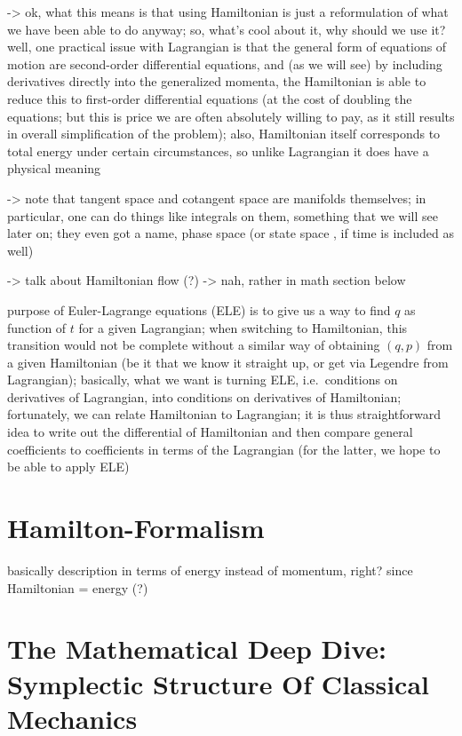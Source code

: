 \documentclass[../class_mech_main.tex]{subfiles}
\begin{document}
-> ok, what this means is that using Hamiltonian is just a reformulation of what we have been able to do anyway; so, what's cool about it, why should we use it? well, one practical issue with Lagrangian is that the general form of equations of motion are second-order differential equations, and (as we will see) by including derivatives directly into the generalized momenta, the Hamiltonian is able to reduce this to first-order differential equations (at the cost of doubling the equations; but this is price we are often absolutely willing to pay, as it still results in overall simplification of the problem); also, Hamiltonian itself corresponds to total energy under certain circumstances, so unlike Lagrangian it does have a physical meaning

-> note that tangent space and cotangent space are manifolds themselves; in particular, one can do things like integrals on them, something that we will see later on; they even got a name, phase space (or state space , if time is included as well)

-> talk about Hamiltonian flow (?) -> nah, rather in math section below


purpose of Euler-Lagrange equations (ELE) is to give us a way to find $q$ as function of $t$ for a given Lagrangian; when switching to Hamiltonian, this transition would not be complete without a similar way of obtaining $(q, p)$ from a given Hamiltonian (be it that we know it straight up, or get via Legendre from Lagrangian); basically, what we want is turning ELE, i.e.~conditions on derivatives of Lagrangian, into conditions on derivatives of Hamiltonian; fortunately, we can relate Hamiltonian to Lagrangian; it is thus straightforward idea to write out the differential of Hamiltonian and then compare general coefficients to coefficients in terms of the Lagrangian (for the latter, we hope to be able to apply ELE)



	\section{Hamilton-Formalism}
basically description in terms of energy instead of momentum, right? since Hamiltonian = energy (?)




	\section{The Mathematical Deep Dive: Symplectic Structure Of Classical Mechanics}
\end{document}
